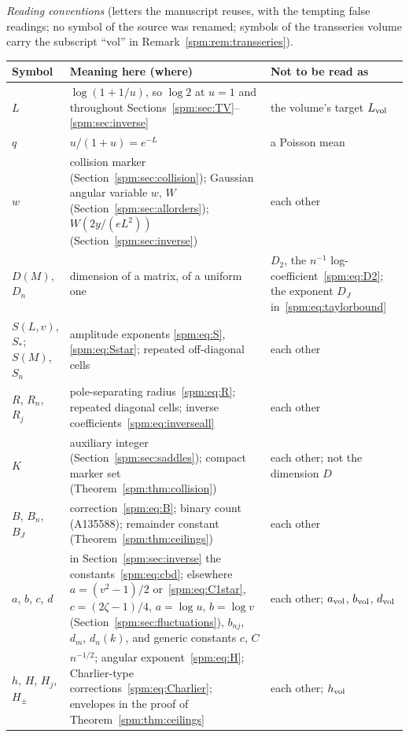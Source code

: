 \medskip\noindent\begin{minipage}{\textwidth}
\emph{Reading conventions} (letters the manuscript reuses, with the
tempting false readings; no symbol of the source was renamed; symbols of
the transseries volume carry the subscript ``vol'' in
Remark~\ref{spm:rem:transseries}).\par
\smallskip
\begingroup\small\renewcommand{\arraystretch}{1.1}
\noindent\begin{tabular}{@{}>{\raggedright\arraybackslash}p{0.75in}>{\raggedright\arraybackslash}p{3.45in}>{\raggedright\arraybackslash}p{1.95in}@{}}
\toprule
Symbol & Meaning here (where) & Not to be read as\\
\midrule
$L$ & $\log(1+1/u)$, so $\log2$ at $u=1$ and throughout Sections~\ref{spm:sec:TV}--\ref{spm:sec:inverse} & the volume's target $L_{\rm vol}$\\
$q$ & $u/(1+u)=e^{-L}$ & a Poisson mean\\
$w$ & collision marker (Section~\ref{spm:sec:collision}); Gaussian angular variable $w$, $W$ (Section~\ref{spm:sec:allorders}); $W(2y/(eL^2))$ (Section~\ref{spm:sec:inverse}) & each other\\
$D(M)$, $D_n$ & dimension of a matrix, of a uniform one & $D_2$, the $n^{-1}$ log-coefficient~\eqref{spm:eq:D2}; the exponent $D_J$ in~\eqref{spm:eq:taylorbound}\\
$S(L,v)$, $S_*$; $S(M)$, $S_n$ & amplitude exponents \eqref{spm:eq:S}, \eqref{spm:eq:Sstar}; repeated off-diagonal cells & each other\\
$R$, $R_n$, $R_j$ & pole-separating radius~\eqref{spm:eq:R}; repeated diagonal cells; inverse coefficients~\eqref{spm:eq:inverseall} & each other\\
$K$ & auxiliary integer (Section~\ref{spm:sec:saddles}); compact marker set (Theorem~\ref{spm:thm:collision}) & each other; not the dimension $D$\\
$B$, $B_n$, $B_J$ & correction~\eqref{spm:eq:B}; binary count (A135588); remainder constant (Theorem~\ref{spm:thm:ceilings}) & each other\\
$a$, $b$, $c$, $d$ & in Section~\ref{spm:sec:inverse} the constants~\eqref{spm:eq:cbd}; elsewhere $a=(v^2-1)/2$ or~\eqref{spm:eq:C1star}, $c=(2\zeta-1)/4$, $a=\log u$, $b=\log v$ (Section~\ref{spm:sec:fluctuations}), $b_{nj}$, $d_m$, $d_n(k)$, and generic constants $c$, $C$ & each other; $a_{\rm vol}$, $b_{\rm vol}$, $d_{\rm vol}$\\
$h$, $H$, $H_j$, $H_\pm$ & $n^{-1/2}$; angular exponent~\eqref{spm:eq:H}; Charlier-type corrections~\eqref{spm:eq:Charlier}; envelopes in the proof of Theorem~\ref{spm:thm:ceilings} & each other; $h_{\rm vol}$\\

\end{tabular}
\end{minipage}
